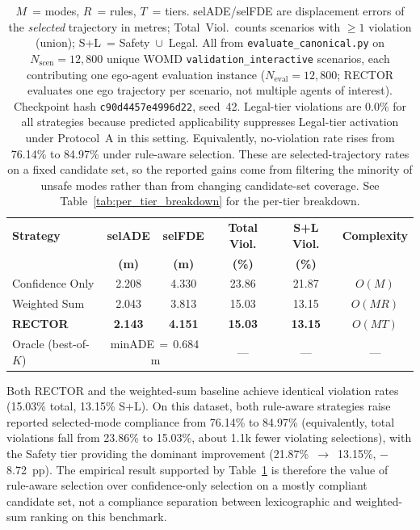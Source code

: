\begin{table}[t]
\centering
\caption{Selection Strategy Comparison: Accuracy, Compliance, and Complexity (Protocol~A)}
\label{tab:selection_strategy}
\setlength{\tabcolsep}{3pt}
\begin{tabular}{lccccc}
\toprule
\textbf{Strategy} & \textbf{selADE} & \textbf{selFDE} & \textbf{Total Viol.} & \textbf{S+L Viol.} & \textbf{Complexity} \\
 & \textbf{(m)} & \textbf{(m)} & \textbf{(\%)} & \textbf{(\%)} & \\
\midrule
Confidence Only & 2.208 & 4.330 & 23.86 & 21.87 & $O(M)$ \\
Weighted Sum & 2.043 & 3.813 & 15.03 & 13.15 & $O(MR)$ \\
\textbf{RECTOR} & \textbf{2.143} & \textbf{4.151} & \textbf{15.03} & \textbf{13.15} & $O(MT)$ \\
\midrule
Oracle (best-of-$K$) & \multicolumn{2}{c}{minADE\,$=$\,0.684\,m} & --- & --- & --- \\
\bottomrule
\end{tabular}
\vspace{1mm}
\caption*{\footnotesize $M$~= modes, $R$~= rules, $T$~= tiers.  selADE/selFDE are displacement errors of the \emph{selected} trajectory in metres; Total~Viol.\ counts scenarios with $\geq 1$ violation (union); S+L~= Safety~$\cup$~Legal.  All from \texttt{evaluate\_canonical.py} on $N_{\text{scen}}{=}12{,}800$ unique WOMD \texttt{validation\_interactive} scenarios, each contributing one ego-agent evaluation instance ($N_{\text{eval}}{=}12{,}800$; RECTOR evaluates one ego trajectory per scenario, not multiple agents of interest).  Checkpoint hash \texttt{c90d4457e4996d22}, seed~42.  Legal-tier violations are 0.0\% for all strategies because predicted applicability suppresses Legal-tier activation under Protocol~A in this setting.  Equivalently, no-violation rate rises from 76.14\% to 84.97\% under rule-aware selection.  These are selected-trajectory rates on a fixed candidate set, so the reported gains come from filtering the minority of unsafe modes rather than from changing candidate-set coverage.  See Table~\ref{tab:per_tier_breakdown} for the per-tier breakdown.}
\end{table}

Both RECTOR and the weighted-sum baseline achieve identical violation rates (15.03\% total, 13.15\% S+L).  On this dataset, both rule-aware strategies raise reported selected-mode compliance from 76.14\% to 84.97\% (equivalently, total violations fall from 23.86\% to 15.03\%, about 1.1k fewer violating selections), with the Safety tier providing the dominant improvement (21.87\%~$\to$~13.15\%, $-$8.72~pp).  The empirical result supported by Table~\ref{tab:selection_strategy} is therefore the value of rule-aware selection over confidence-only selection on a mostly compliant candidate set, not a compliance separation between lexicographic and weighted-sum ranking on this benchmark.

